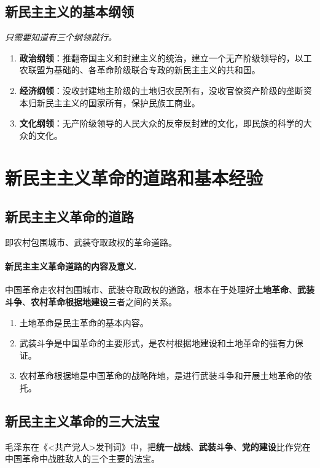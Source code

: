     \subsection{新民主主义的基本纲领}
    \emph{只需要知道有三个纲领就行。}
    \begin{enumerate}
        \item \textbf{政治纲领}：推翻帝国主义和封建主义的统治，建立一个无产阶级领导的，以工农联盟为基础的、各革命阶级联合专政的新民主主义的共和国。
        \item \textbf{经济纲领}：没收封建地主阶级的土地归农民所有，没收官僚资产阶级的垄断资本归新民主主义的国家所有，保护民族工商业。
        \item \textbf{文化纲领}：无产阶级领导的人民大众的反帝反封建的文化，即民族的科学的大众的文化。
    \end{enumerate}


\section{新民主主义革命的道路和基本经验}

    \subsection{新民主主义革命的道路}
    即农村包围城市、武装夺取政权的革命道路。
    \paragraph{新民主主义革命道路的内容及意义.} 中国革命走农村包围城市、武装夺取政权的道路，根本在于处理好\textbf{土地革命}、\textbf{武装斗争}、\textbf{农村革命根据地建设}三者之间的关系。
    \begin{enumerate}
        \item 土地革命是民主革命的基本内容。
        \item 武装斗争是中国革命的主要形式，是农村根据地建设和土地革命的强有力保证。
        \item 农村革命根据地是中国革命的战略阵地，是进行武装斗争和开展土地革命的依托。
    \end{enumerate}

    \subsection{新民主主义革命的三大法宝}
        毛泽东在《<共产党人>发刊词》中，把\textbf{统一战线}、\textbf{武装斗争}、\textbf{党的建设}比作党在中国革命中战胜敌人的三个主要的法宝。


